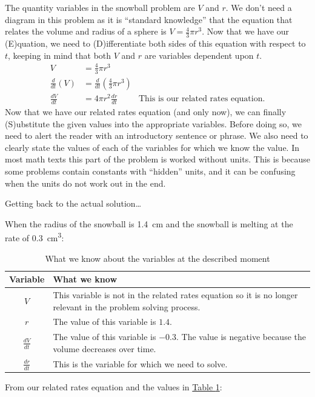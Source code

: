 \documentclass[12pt,]{book}
\newcommand{\acronym}[1]{#1}
\theoremstyle{plain}
\theoremstyle{definition}
\numberwithin{equation}{section}
\newcommand{\lz}[2]{\frac{d#1}{d#2}}
\newcommand{\lzoo}[2]{{\frac{d}{d#1}}{\left(#2\right)}}
\begin{document}
The quantity variables in the snowball problem are \(V\) and \(r\). We don't need a diagram in this problem as it is ``standard knowledge'' that the equation that relates the volume and radius of a sphere is \(V=\frac{4}{3}\pi r^3\). Now that we have our (\acronym{E})quation, we need to (\acronym{D})ifferentiate both sides of this equation with respect to \(t\), keeping in mind that both \(V\) and \(r\) are variables dependent upon \(t\).\begin{align*}
V&=\frac{4}{3}\pi r^3\\
\lzoo{t}{V}&=\lzoo{t}{\frac{4}{3}\pi r^3}\\
\lz{V}{t}&=4\pi r^2\lz{r}{t}&\text{This is our related rates equation.}
\end{align*}Now that we have our related rates equation (and only now), we can finally (\acronym{S})ubstitute the given values into the appropriate variables. Before doing so, we need to alert the reader with an introductory sentence or phrase. We also need to clearly state the values of each of the variables for which we know the value. In most math texts this part of the problem is worked without units. This is because some problems contain constants with ``hidden'' units, and it can be confusing when the units do not work out in the end.%
\par
Getting back to the actual solution\dots{}%
\par
When the radius of the snowball is \SI{1.4}{\centi\meter} and the snowball is melting at the rate of \SI{0.3}{\centi\meter\tothe{3}}:%
\begin{table}
\centering
\caption{What we know about the variables at the described moment\label{table-snowball-what-we-know}}
\begin{tabular}{cp{4in}}
\toprule
Variable&What we know\\
\midrule
\(V\)&This variable is not in the related rates equation so it is no longer relevant in the problem solving process.\\
\midrule
\(r\)&The value of this variable is \(1.4\).\\
\midrule
\(\lz{V}{t}\)&The value of this variable is \(-0.3\). The value is negative because the volume decreases over time.\\
\midrule
\(\lz{r}{t}\)&This is the variable for which we need to solve.\\
\bottomrule
\end{tabular}
\end{table}
\par
From our related rates equation and the values in \hyperref[table-snowball-what-we-know]{Table \ref{table-snowball-what-we-know}}:%
\end{document}
